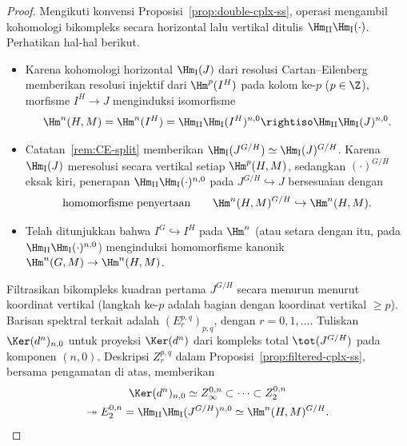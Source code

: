 \begin{proof}
	Mengikuti konvensi Proposisi~\ref{prop:double-cplx-ss}, operasi mengambil
	kohomologi bikompleks secara horizontal lalu vertikal ditulis
	$\Hm_{\mathrm{II}}\Hm_{\mathrm{I}}(\cdot)$. Perhatikan hal-hal berikut.
	\begin{itemize}
		\item Karena kohomologi horizontal $\Hm_{\mathrm{I}}(J)$ dari resolusi
		Cartan--Eilenberg memberikan resolusi injektif dari $\Hm^p(I^H)$ pada
		kolom ke-$p$ ($p\in\Z$), morfisme $I^H\to J$ menginduksi isomorfisme
		\[ \Hm^n(H,M)=\Hm^n(I^H)
		=\Hm_{\mathrm{II}}\Hm_{\mathrm{I}}(I^H)^{n,0}
		\rightiso\Hm_{\mathrm{II}}\Hm_{\mathrm{I}}(J)^{n,0}. \]
		\item Catatan~\ref{rem:CE-split} memberikan
		$\Hm_{\mathrm{I}}(J^{G/H})\simeq\Hm_{\mathrm{I}}(J)^{G/H}$. Karena
		$\Hm_{\mathrm{I}}(J)$ meresolusi secara vertikal setiap
		$\Hm^p(H,M)$, sedangkan $(\cdot)^{G/H}$ eksak kiri, penerapan
		$\Hm_{\mathrm{II}}\Hm_{\mathrm{I}}(\cdot)^{n,0}$ pada
		$J^{G/H}\hookrightarrow J$ bersesuaian dengan
		\[ \text{homomorfisme penyertaan}\qquad
		\Hm^n(H,M)^{G/H}\hookrightarrow\Hm^n(H,M). \]
		\item Telah ditunjukkan bahwa $I^G\hookrightarrow I^H$ pada $\Hm^n$
		(atau setara dengan itu, pada
		$\Hm_{\mathrm{II}}\Hm_{\mathrm{I}}(\cdot)^{n,0}$) menginduksi
		homomorfisme kanonik $\Hm^n(G,M)\to\Hm^n(H,M)$.
	\end{itemize}

	Filtrasikan bikompleks kuadran pertama $J^{G/H}$ secara menurun menurut
	koordinat vertikal (langkah ke-$p$ adalah bagian dengan koordinat vertikal
	$\geq p$). Barisan spektral terkait adalah $(E_r^{p,q})_{p,q}$, dengan
	$r=0,1,\ldots$. Tuliskan $\Ker(d^n)_{n,0}$ untuk proyeksi
	$\Ker(d^n)$ dari kompleks total $\tot(J^{G/H})$ pada komponen $(n,0)$.
	Deskripsi $Z_r^{p,q}$ dalam Proposisi~\ref{prop:filtered-cplx-ss}, bersama
	pengamatan di atas, memberikan
	\begin{multline}\label{eqn:LHS-SS-aux1}
		\Ker(d^n)_{n,0}\simeq Z_\infty^{0,n}
		\subset\cdots\subset Z_2^{0,n}\\
		\twoheadrightarrow E_2^{0,n}
		=\Hm_{\mathrm{II}}\Hm_{\mathrm{I}}(J^{G/H})^{n,0}
		\simeq\Hm^n(H,M)^{G/H}.
	\end{multline}


\end{proof}
